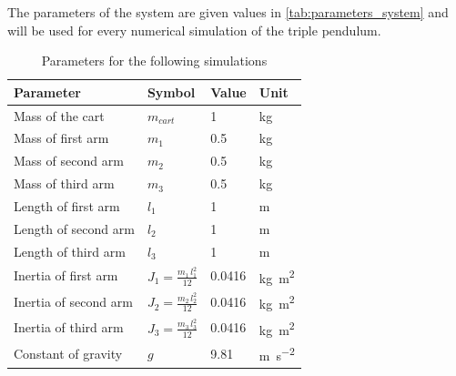 \documentclass[a4paper,12pt,twoside]{article}
\begin{document}
The parameters of the system are given values in \autoref{tab:parameters_system} and will be used for every numerical simulation of the triple pendulum.
\begin{table}[H]
	\centering
	\caption{Parameters for the following simulations}
	\label{tab:parameters_system}
	\begin{tabular}{@{}llll@{}}
		\toprule
		Parameter             & Symbol                      & Value  & Unit                         \\ \midrule
		Mass of the cart      & $m_{cart}$                  & 1      & kg                           \\
		Mass of first arm     & $m_1$                       & 0.5    & kg                           \\
		Mass of second arm    & $m_2$                       & 0.5    & kg                           \\
		Mass of third arm     & $m_3$                       & 0.5    & kg                           \\
		Length of first arm   & $l_1$                       & 1      & m                            \\
		Length of second arm  & $l_2$                       & 1      & m                            \\
		Length of third arm   & $l_3$                       & 1      & m                            \\
		Inertia of first arm  & $J_1=\frac{m_1\,l_1^2}{12}$ & 0.0416 & \si{\kilo\gram\square\metre} \\
		Inertia of second arm & $J_2=\frac{m_2\,l_2^2}{12}$ & 0.0416 & \si{\kilo\gram\square\metre} \\
		Inertia of third arm  & $J_3=\frac{m_3\,l_3^2}{12}$ & 0.0416 & \si{\kilo\gram\square\metre} \\
		Constant of gravity   & $g$                         & 9.81   & \si{m\per\square\second}     \\ \bottomrule
	\end{tabular}
\end{table}
\end{document}
